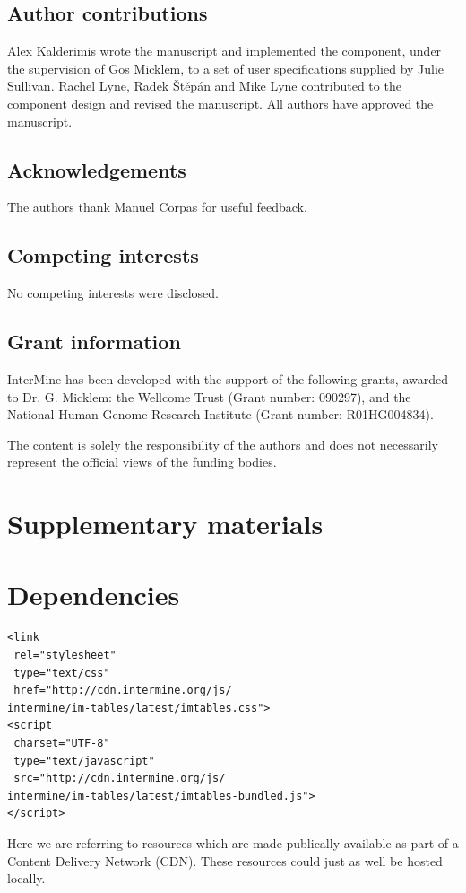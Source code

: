 \documentclass[10pt,a4paper,twocolumn]{article}
\begin{document}
\subsection*{Author contributions}
Alex Kalderimis wrote the manuscript and implemented the component, under the
supervision of Gos Micklem, to a set of user specifications supplied by Julie
Sullivan. Rachel Lyne, Radek Štěpán and Mike Lyne contributed to the
component design and revised the manuscript. All authors have approved the
manuscript.

\subsection*{Acknowledgements}
The authors thank Manuel Corpas for useful feedback.

\subsection*{Competing interests}
No competing interests were disclosed.

\subsection*{Grant information}
InterMine has been developed with the support of the following grants, awarded
to Dr. G. Micklem: the Wellcome Trust (Grant number: 090297),
and the National Human Genome Research Institute (Grant number: R01HG004834).

The content is solely the responsibility of the authors and does not necessarily
represent the official views of the funding bodies.

\nocite{*}
{\small
}

\section*{Supplementary materials}
\appendix
\section{Dependencies} \label{sec:deps}

\lstset{language=HTML}

\begin{lstlisting}
<link
 rel="stylesheet"
 type="text/css"
 href="http://cdn.intermine.org/js/
intermine/im-tables/latest/imtables.css">
<script
 charset="UTF-8"
 type="text/javascript"
 src="http://cdn.intermine.org/js/
intermine/im-tables/latest/imtables-bundled.js">
</script>
\end{lstlisting}

Here we are referring to resources which are made publically available
as part of a Content Delivery Network (CDN). These resources could just
as well be hosted locally.
\end{document}
